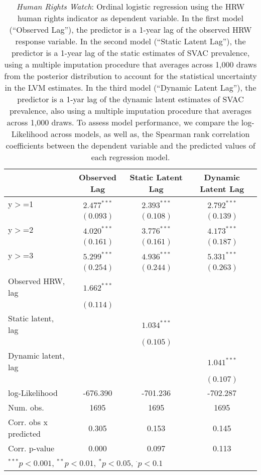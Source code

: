 
\begin{table}[h]
\begin{center}
\begin{tabular}{l c c c }
\hline
 & Observed Lag & Static Latent Lag & Dynamic Latent Lag \\
\hline
y$>$=1                & $2.477^{***}$ & $2.393^{***}$ & $2.792^{***}$ \\
                      & $(0.093)$     & $(0.108)$     & $(0.139)$     \\
y$>$=2                & $4.020^{***}$ & $3.776^{***}$ & $4.173^{***}$ \\
                      & $(0.161)$     & $(0.161)$     & $(0.187)$     \\
y$>$=3                & $5.299^{***}$ & $4.936^{***}$ & $5.331^{***}$ \\
                      & $(0.254)$     & $(0.244)$     & $(0.263)$     \\
Observed HRW, lag     & $1.662^{***}$ &               &               \\
                      & $(0.114)$     &               &               \\
Static  latent, lag   &               & $1.034^{***}$ &               \\
                      &               & $(0.105)$     &               \\
Dynamic latent, lag   &               &               & $1.041^{***}$ \\
                      &               &               & $(0.107)$     \\
\hline
log-Likelihood        & -676.390      & -701.236      & -702.287      \\
Num. obs.             & 1695          & 1695          & 1695          \\
Corr. obs x predicted & 0.305         & 0.153         & 0.145         \\
Corr. p-value         & 0.000         & 0.097         & 0.113         \\
\hline
\multicolumn{4}{l}{\scriptsize{$^{***}p<0.001$, $^{**}p<0.01$, $^*p<0.05$, $^{\cdot}p<0.1$}}
\end{tabular}
\caption{\emph{Human Rights Watch}: Ordinal logistic regression using the HRW human rights 
       indicator as dependent variable. In the first model (``Observed Lag''), the predictor is a 1-year lag
       of the observed HRW response variable. In the second model (``Static Latent Lag''), the predictor is a 1-year
       lag of the static estimates of SVAC prevalence, using a multiple imputation procedure that averages across 1,000 draws
        from the posterior distribution to account for the statistical uncertainty in the LVM estimates. 
       In the third model (``Dynamic Latent Lag''), the predictor is a 1-yar lag of the dynamic latent 
       estimates of SVAC prevalence, also using a multiple imputation procedure that averages across 1,000 draws. To assess
       model performance, we compare the log-Likelihood across models, as well as, the Spearman rank
       correlation coefficients between the dependent variable and the predicted values of each regression
       model.}
\label{xt-hrw}
\end{center}
\end{table}
